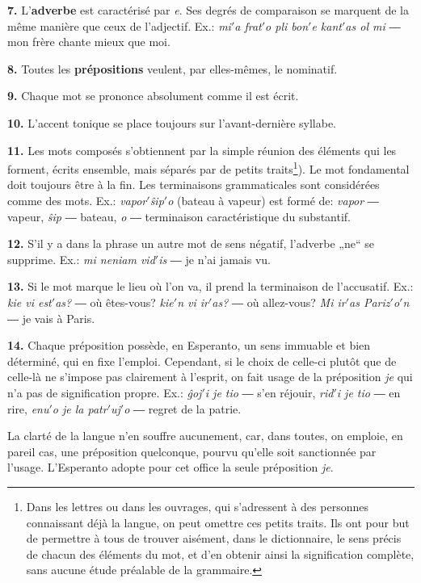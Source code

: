 \textbf{7.} L’\textbf{adverbe} est caractérisé par \emph{e}. Ses degrés de comparaison se marquent de la même manière que ceux de l’adjectif. Ex.: \emph{mi$'$a frat$'$o pli bon$'$e kant$'$as ol mi} ― mon frère chante mieux que moi.

\textbf{8.} Toutes les \textbf{prépositions} veulent, par elles-mêmes, le nominatif.

\begin{center}
\large {}
\end{center}

\textbf{9.} Chaque mot se prononce absolument comme il est écrit.

\textbf{10.} L’accent tonique se place toujours sur l’avant-dernière syllabe.

\textbf{11.} Les mots composés s’obtiennent par la simple réunion des éléments qui les forment, écrits ensemble, mais séparés par de petits traits\footnote{Dans les lettres ou dans les ouvrages, qui s’adressent à des personnes connaissant déjà la langue, on peut omettre ces petits traits. Ils ont pour but de permettre à tous de trouver aisément, dans le dictionnaire, le sens précis de chacun des éléments du mot, et d’en obtenir ainsi la signification complète, sans aucune étude préalable de la grammaire.}). Le mot fondamental doit toujours être à la fin. Les terminaisons grammaticales sont considérées comme des mots. Ex.: \emph{vapor$'$ŝip$'$o} (bateau à vapeur) est formé de: \emph{vapor} ― vapeur, \emph{ŝip} ― bateau, \emph{o} ― terminaison caractéristique du substantif.

\textbf{12.} S’il y a dans la phrase un autre mot de sens négatif, l’adverbe „ne“ se supprime. Ex.: \emph{mi neniam vid$'$is} ― je n’ai jamais vu.

\textbf{13.} Si le mot marque le lieu où l’on va, il prend la terminaison de l’accusatif. Ex.: \emph{kie vi est$'$as?} ― où êtes-vous? \emph{kie$'$n vi ir$'$as?} ― où allez-vous? \emph{Mi ir$'$as Pariz$'$o$'$n} ― je vais à Paris.

\textbf{14.} Chaque préposition possède, en Esperanto, un sens immuable et bien déterminé, qui en fixe l’emploi. Cependant, si le choix de celle-ci plutôt que de celle-là ne s’impose pas clairement à l’esprit, on fait usage de la préposition \emph{je} qui n’a pas de signification propre. Ex.: \emph{ĝoj$'$i je tio} ― s’en réjouir, \emph{rid$'$i je tio} ― en rire, \emph{enu$'$o je la patr$'$uj$'$o} ― regret de la patrie.

La clarté de la langue n’en souffre aucunement, car, dans toutes, on emploie, en pareil cas, une préposition quelconque, pourvu qu’elle soit sanctionnée par l’usage. L’Esperanto adopte pour cet office la seule préposition \emph{je}.

